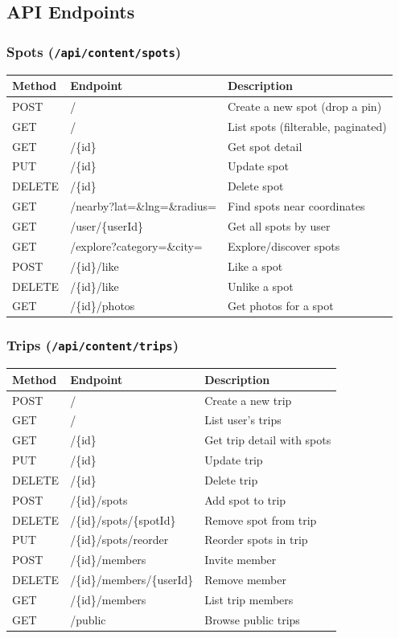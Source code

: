 \documentclass[12pt,letterpaper]{article}
\begin{document}
\subsection{API Endpoints}

\subsubsection{Spots (\texttt{/api/content/spots})}
\begin{tabular}{|l|l|l|}
\hline
\textbf{Method} & \textbf{Endpoint} & \textbf{Description} \\
\hline
POST   & / & Create a new spot (drop a pin) \\
GET    & / & List spots (filterable, paginated) \\
GET    & /\{id\} & Get spot detail \\
PUT    & /\{id\} & Update spot \\
DELETE & /\{id\} & Delete spot \\
GET    & /nearby?lat=\&lng=\&radius= & Find spots near coordinates \\
GET    & /user/\{userId\} & Get all spots by user \\
GET    & /explore?category=\&city= & Explore/discover spots \\
POST   & /\{id\}/like & Like a spot \\
DELETE & /\{id\}/like & Unlike a spot \\
GET    & /\{id\}/photos & Get photos for a spot \\
\hline
\end{tabular}

\subsubsection{Trips (\texttt{/api/content/trips})}
\begin{tabular}{|l|l|l|}
\hline
\textbf{Method} & \textbf{Endpoint} & \textbf{Description} \\
\hline
POST   & / & Create a new trip \\
GET    & / & List user's trips \\
GET    & /\{id\} & Get trip detail with spots \\
PUT    & /\{id\} & Update trip \\
DELETE & /\{id\} & Delete trip \\
POST   & /\{id\}/spots & Add spot to trip \\
DELETE & /\{id\}/spots/\{spotId\} & Remove spot from trip \\
PUT    & /\{id\}/spots/reorder & Reorder spots in trip \\
POST   & /\{id\}/members & Invite member \\
DELETE & /\{id\}/members/\{userId\} & Remove member \\
GET    & /\{id\}/members & List trip members \\
GET    & /public & Browse public trips \\
\hline
\end{tabular}
\end{document}
